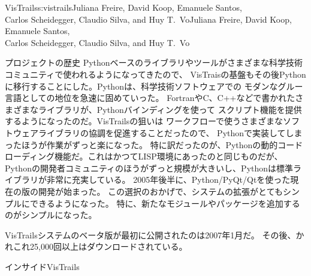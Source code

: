 \begin{aosachaptertoc}{VisTrails}{s:vistrails}{Juliana Freire, David Koop, Emanuele Santos, \\ Carlos Scheidegger, Claudio Silva, and Huy T.\ Vo}{Juliana Freire, David Koop, Emanuele Santos, \\ \hspace*{0.9cm} Carlos Scheidegger, Claudio Silva, and Huy T.\ Vo}
\begin{aosasect1}{プロジェクトの歴史}
Pythonベースのライブラリやツールがさまざまな科学技術コミュニティで使われるようになってきたので、
VisTraisの基盤もその後Pythonに移行することにした。Pythonは、科学技術ソフトウェアでの
モダンなグルー言語としての地位を急速に固めていった。
FortranやC、C++などで書かれたさまざまなライブラリが、Pythonバインディングを使って
スクリプト機能を提供するようになったのだ。VisTrailsの狙いは
ワークフローで使うさまざまなソフトウェアライブラリの協調を促進することだったので、
Pythonで実装してしまったほうが作業がずっと楽になった。
特に訳だったのが、Pythonの動的コードローディング機能だ。これはかつてLISP環境にあったのと同じものだが、
Pythonの開発者コミュニティのほうがずっと規模が大きいし、Pythonは標準ライブラリが非常に充実している。
2005年後半に、Python/PyQt/Qtを使った現在の版の開発が始まった。
この選択のおかげで、システムの拡張がとてもシンプルにできるようになった。
特に、新たなモジュールやパッケージを追加するのがシンプルになった。

VisTrailsシステムのベータ版が最初に公開されたのは2007年1月だ。
その後、かれこれ25,000回以上はダウンロードされている。

\end{aosasect1}

\begin{aosasect1}{インサイドVisTrails}


\end{aosasect1}
\end{aosachaptertoc}
